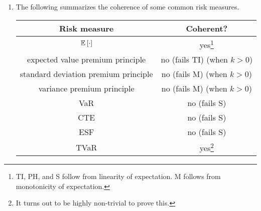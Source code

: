 \begin{enumerate}
\item \label{it:coherence-summary}
The following summarizes the coherence of some common risk measures.
\begin{center}
\begin{tabular}{cc}
\toprule
Risk measure&Coherent?\\
\midrule
\(\mathbb{E}\left[\cdot\right]\)&yes\footnote{TI, PH, and S follow from linearity
of expectation. M follows from monotonicity of expectation.}\\
expected value premium principle&no (fails TI) (when \(k>0\))\\
standard deviation premium principle&no (fails M) (when \(k>0\))\\
variance premium principle&no (fails M) (when \(k>0\))\\
VaR&no (fails S)\\
CTE&no (fails S)\\
ESF&no (fails S)\\
TVaR&yes\footnote{It turns out to be highly non-trivial to prove this.}\\
\bottomrule
\end{tabular}
\end{center}
\end{enumerate}
